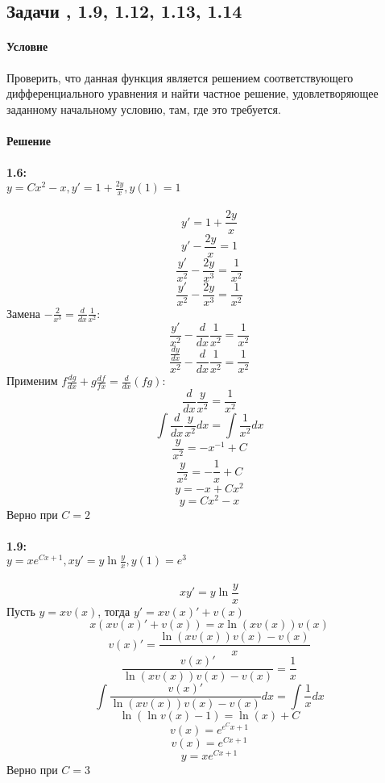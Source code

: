 \subsection{Задачи , 1.9, 1.12, 1.13, 1.14}
\paragraph{Условие}
Проверить, что данная функция является решением соответствующего дифференциального уравнения и найти частное решение, удовлетворяющее заданному начальному условию, там, где это требуется.
\paragraph{Решение}
\paragraph{1.6:\\ $y = Cx^2 - x, y' = 1 + \frac{2y}{x}, y(1) = 1$}
\[y' = 1 + \frac{2y}{x}\]
\[y' - \frac{2y}{x} = 1\]
\[\frac{y'}{x^2} - \frac{2y}{x^3} = \frac{1}{x^2}\]
\[\frac{y'}{x^2} - \frac{2y}{x^3} = \frac{1}{x^2}\]
Замена $-\frac{2}{x^3} = \frac{d}{dx}\frac{1}{x^2}$:
\[\frac{y'}{x^2} - \frac{d}{dx}\frac{1}{x^2} = \frac{1}{x^2}\]
\[\frac{\frac{dy}{dx}}{x^2} - \frac{d}{dx}\frac{1}{x^2} = \frac{1}{x^2}\]
Применим $f\frac{dg}{dx} + g\frac{df}{fx} = \frac{d}{dx}(fg)$:
\[\frac{d}{dx}\frac{y}{x^2} = \frac{1}{x^2}\]
\[\int\frac{d}{dx}\frac{y}{x^2}dx = \int\frac{1}{x^2}dx\]
\[\frac{y}{x^2} = -x^{-1} + C\]
\[\frac{y}{x^2} = -\frac{1}{x} + C\]
\[y = -x + Cx^2\]
\[y = Cx^2 - x\]
Верно при $C = 2$

\paragraph{1.9:\\ $y = xe^{Cx + 1}, xy' = y\ln\frac{y}{x}, y(1) = e^3$}
\[xy' = y\ln\frac{y}{x}\]
Пусть $y = x v(x)$, тогда $y' = xv(x)' + v(x)$
\[x(xv(x)' + v(x)) = x \ln(x v(x))v(x)\]
\[v(x)' = \frac{\ln(x v(x))v(x) - v(x)}{x}\]
\[\frac{v(x)'}{\ln(x v(x))v(x) - v(x)} = \frac{1}{x}\]
\[\int \frac{v(x)'}{\ln(x v(x))v(x) - v(x)}dx = \int \frac{1}{x}dx\]
\[\ln(\ln v(x) - 1) = \ln(x) + C\]
\[v(x) = e^{e^Cx + 1}\]
\[v(x) = e^{Cx + 1}\]
\[y = xe^{Cx + 1}\]
Верно при $C = 3$

